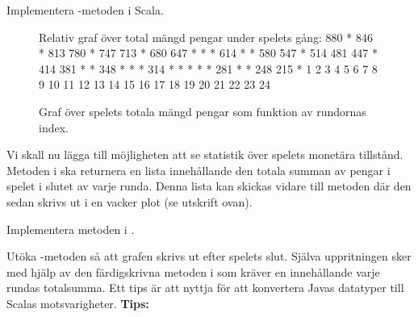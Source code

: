 \Subtask Implementera -metoden i Scala.

\begin{figure}[H]
\centering

\begin{REPL}
Relativ graf över total mängd pengar under spelets gång:
880  *
846     *
813
780        *
747
713           *
680
647              *  *  *
614                       *  *
580
547                             *
514
481
447                                *
414
381                                   *  *
348                                         *  *  *
314                                                  *  *  *  *  *
281                                                                 *  *
248
215                                                                       *
     1  2  3  4  5  6  7  8  9  10 11 12 13 14 15 16 17 18 19 20 21 22 23 24
\end{REPL}
\caption {Graf över spelets totala mängd pengar som funktion av rundornas index.}
\label{fig:scalajava:lthopoly-team:statistics}
\end{figure}

\Task Vi skall nu lägga till möjligheten att se statistik över spelets monetära tillstånd. Metoden  i  ska returnera en lista innehållande den totala summan av pengar i spelet i slutet av varje runda. Denna lista kan skickas vidare till metoden  där den sedan skrivs ut i en vacker plot (se utskrift ovan).

\Subtask Implementera metoden  i .

\Subtask Utöka -metoden så att grafen skrivs ut efter spelets slut.
Själva uppritningen sker med hjälp av den färdigskrivna metoden  i  som kräver en  innehållande varje rundas totalsumma.
Ett tips är att nyttja  för att konvertera Javas datatyper till Scalas motsvarigheter.
\newline
\newline
\textbf{Tips:}

